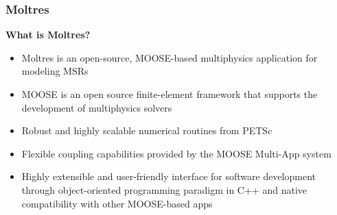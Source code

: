 \begin{frame}
  \frametitle{Moltres}
  \textbf{What is Moltres?}
  \begin{itemize}
    \item Moltres \cite{lindsay_introduction_2018} is an open-source, MOOSE-based
      multiphysics application for modeling MSRs
	\item \gls{MOOSE} \cite{lindsay_20_2022} is an open source finite-element framework
      that supports the development of multiphysics solvers
    \item Robust and highly scalable numerical routines from PETSc
    \item Flexible coupling capabilities provided by the MOOSE Multi-App system
    \item Highly extensible and user-friendly interface for software development through
      object-oriented programming paradigm in C++ and native compatibility with other MOOSE-based
      apps
  \end{itemize}
\end{frame}

